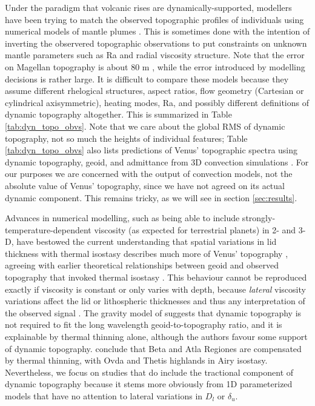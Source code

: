 Under the paradigm that volcanic rises are dynamically-supported, modellers have been trying to match the observed topographic profiles of individuals using numerical models of mantle plumes \citep{Kiefer1991, Kiefer1992, Moresi1995, Nimmo1996, Smrekar1996, Kiefer1998}. This is sometimes done with the intention of inverting the observered topographic observations to put constraints on unknown mantle parameters such as Ra and radial viscosity structure. Note that the error on Magellan topography is about 80 m \citep{Pettengill1992}, while the error introduced by modelling decisions is rather large. It is difficult to compare these models because they assume different rhelogical structures, aspect ratios, flow geometry (Cartesian or cylindrical axisymmetric), heating modes, Ra, and possibly different definitions of dynamic topography altogether. This is summarized in Table \ref{tab:dyn_topo_obvs}. Note that we care about the global RMS of dynamic topography, not so much the heights of individual features; Table \ref{tab:dyn_topo_obvs} also lists predictions of Venus' topographic spectra using dynamic topography, geoid, and admittance from 3D convection simulations \citep{Golle2012, Benesova2012, Huang2013, Wei2014}. For our purposes we are concerned with the output of convection models, not the absolute value of Venus' topography, since we have not agreed on its actual dynamic component. This remains tricky, as we will see in section \ref{sec:results}. 


Advances in numerical modelling, such as being able to include strongly-temperature-dependent viscosity (as expected for terrestrial planets) in 2- and 3-D, have bestowed the current understanding that spatial variations in lid thickness with thermal isostasy describes much more of Venus' topography \citep{Solomatov1996a, Orth2011}, agreeing with earlier theoretical relationships between geoid and observed topography that invoked thermal isostasy \citep{Kucinskas1994, Moore1995, Moore1997}. This behaviour cannot be reproduced exactly if viscosity is constant or only varies with depth, because \emph{lateral} viscosity variations affect the lid or lithospheric thicknesses and thus any interpretation of the observed signal \citep{Orth2011}. The gravity model of \citet{Smrekar1991} suggests that dynamic topography is not required to fit the long wavelength geoid-to-topography ratio, and it is explainable by thermal thinning alone, although the authors favour some support of dynamic topography. \citet{Kucinskas1994} conclude that Beta and Atla Regiones are compensated by thermal thinning, with Ovda and Thetis highlands in Airy isostasy. Nevertheless, we focus on studies that do include the tractional component of dynamic topography because it stems more obviously from 1D parameterized models that have no attention to lateral variations in $D_l$ or $\delta_u$.

